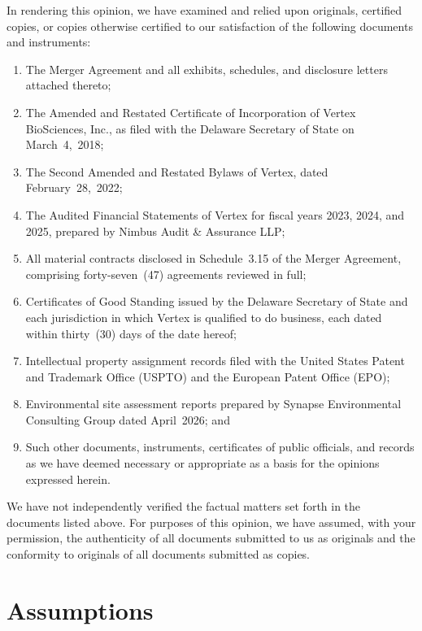 \documentclass[11pt,a4paper]{scrartcl}
\begin{document}
In rendering this opinion, we have examined and relied upon originals, certified copies, or
copies otherwise certified to our satisfaction of the following documents and instruments:

\begin{enumerate}[label=(\roman*)]
  \item The Merger Agreement and all exhibits, schedules, and disclosure letters attached thereto;
  \item The Amended and Restated Certificate of Incorporation of Vertex BioSciences, Inc., as
    filed with the Delaware Secretary of State on March~4,~2018;
  \item The Second Amended and Restated Bylaws of Vertex, dated February~28,~2022;
  \item The Audited Financial Statements of Vertex for fiscal years 2023, 2024, and 2025,
    prepared by Nimbus Audit \& Assurance LLP;
  \item All material contracts disclosed in Schedule~3.15 of the Merger Agreement, comprising
    forty-seven~(47) agreements reviewed in full;
  \item Certificates of Good Standing issued by the Delaware Secretary of State and each
    jurisdiction in which Vertex is qualified to do business, each dated within thirty~(30)
    days of the date hereof;
  \item Intellectual property assignment records filed with the United States Patent and Trademark
    Office (USPTO) and the European Patent Office (EPO);
  \item Environmental site assessment reports prepared by Synapse Environmental Consulting Group
    dated April~2026; and
  \item Such other documents, instruments, certificates of public officials, and records as we
    have deemed necessary or appropriate as a basis for the opinions expressed herein.
\end{enumerate}

We have not independently verified the factual matters set forth in the documents listed above.
For purposes of this opinion, we have assumed, with your permission, the authenticity of all
documents submitted to us as originals and the conformity to originals of all documents
submitted as copies.

\section{Assumptions}
\end{document}
